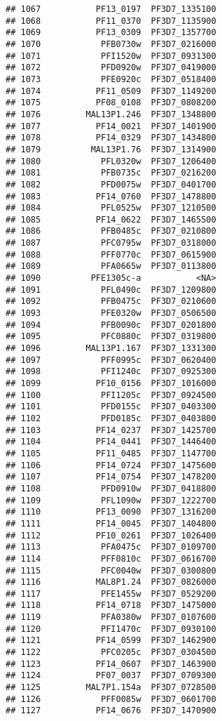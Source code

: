 \documentclass[12pt, a4paper]{article}\usepackage[]{graphicx}\usepackage[]{color}
\makeatletter
\newenvironment{kframe}{%
 \def\at@end@of@kframe{}%
 \ifinner\ifhmode%
  \def\at@end@of@kframe{\end{minipage}}%
  \begin{minipage}{\columnwidth}%
 \fi\fi%
 \def\FrameCommand##1{\hskip\@totalleftmargin \hskip-\fboxsep
 \colorbox{shadecolor}{##1}\hskip-\fboxsep
     \hskip-\linewidth \hskip-\@totalleftmargin \hskip\columnwidth}%
 \MakeFramed {\advance\hsize-\width
   \@totalleftmargin\z@ \linewidth\hsize
   \@setminipage}}%
 {\par\unskip\endMakeFramed%
 \at@end@of@kframe}
\newenvironment{knitrout}{}{} %
\makeatother
\begin{document}
\begin{knitrout}
\begin{kframe}
\begin{verbatim}
## 1067           PF13_0197  PF3D7_1335100
## 1068           PF11_0370  PF3D7_1135900
## 1069           PF13_0309  PF3D7_1357700
## 1070            PFB0730w  PF3D7_0216000
## 1071            PFI1520w  PF3D7_0931300
## 1072            PFD0920w  PF3D7_0419000
## 1073            PFE0920c  PF3D7_0518400
## 1074           PF11_0509  PF3D7_1149200
## 1075           PF08_0108  PF3D7_0808200
## 1076         MAL13P1.246  PF3D7_1348800
## 1077           PF14_0021  PF3D7_1401900
## 1078           PF14_0329  PF3D7_1434800
## 1079          MAL13P1.76  PF3D7_1314900
## 1080            PFL0320w  PF3D7_1206400
## 1081            PFB0735c  PF3D7_0216200
## 1082            PFD0075w  PF3D7_0401700
## 1083           PF14_0760  PF3D7_1478800
## 1084            PFL0525w  PF3D7_1210500
## 1085           PF14_0622  PF3D7_1465500
## 1086            PFB0485c  PF3D7_0210800
## 1087            PFC0795w  PF3D7_0318000
## 1088            PFF0770c  PF3D7_0615900
## 1089            PFA0665w  PF3D7_0113800
## 1090          PFE1305c-a           <NA>
## 1091            PFL0490c  PF3D7_1209800
## 1092            PFB0475c  PF3D7_0210600
## 1093            PFE0320w  PF3D7_0506500
## 1094            PFB0090c  PF3D7_0201800
## 1095            PFC0880c  PF3D7_0319800
## 1096         MAL13P1.167  PF3D7_1331300
## 1097            PFF0995c  PF3D7_0620400
## 1098            PFI1240c  PF3D7_0925300
## 1099           PF10_0156  PF3D7_1016000
## 1100            PFI1205c  PF3D7_0924500
## 1101            PFD0155c  PF3D7_0403300
## 1102            PFD0185c  PF3D7_0403800
## 1103           PF14_0237  PF3D7_1425700
## 1104           PF14_0441  PF3D7_1446400
## 1105           PF11_0485  PF3D7_1147700
## 1106           PF14_0724  PF3D7_1475600
## 1107           PF14_0754  PF3D7_1478200
## 1108            PFD0910w  PF3D7_0418800
## 1109            PFL1090w  PF3D7_1222700
## 1110           PF13_0090  PF3D7_1316200
## 1111           PF14_0045  PF3D7_1404800
## 1112           PF10_0261  PF3D7_1026400
## 1113            PFA0475c  PF3D7_0109700
## 1114            PFF0810c  PF3D7_0616700
## 1115            PFC0040w  PF3D7_0300800
## 1116           MAL8P1.24  PF3D7_0826000
## 1117            PFE1455w  PF3D7_0529200
## 1118           PF14_0718  PF3D7_1475000
## 1119            PFA0380w  PF3D7_0107600
## 1120            PFI1470c  PF3D7_0930100
## 1121           PF14_0599  PF3D7_1462900
## 1122            PFC0205c  PF3D7_0304500
## 1123           PF14_0607  PF3D7_1463900
## 1124           PF07_0037  PF3D7_0709300
## 1125         MAL7P1.154a  PF3D7_0728500
## 1126            PFF0085w  PF3D7_0601700
## 1127           PF14_0676  PF3D7_1470900

\end{verbatim}
\end{kframe}
\end{knitrout}
\end{document}

